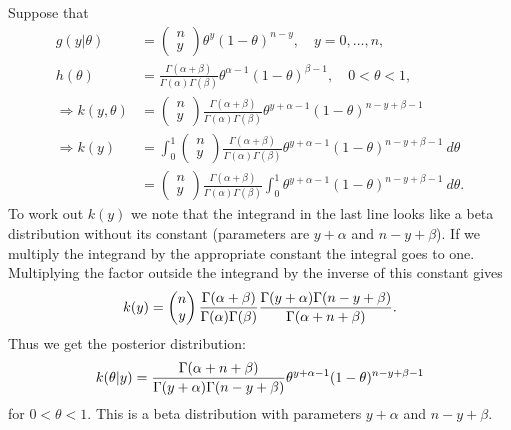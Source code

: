 \documentclass[10pt, two column]{article}
\begin{document}
Suppose that \vspace{-10pt}
\begin{align*} 
g(y \vert \theta) &= \begin{pmatrix} n \\ y \end{pmatrix} \theta^{y} (1 - \theta)^{n-y}, \quad y = 0, \dots, n, \\
h(\theta) &= \frac{\Gamma(\alpha + \beta)}{\Gamma(\alpha) \Gamma(\beta)} \theta^{\alpha -1} (1-\theta)^{\beta - 1}, \quad 0 < \theta < 1, \\
\Rightarrow k(y, \theta) &= \begin{pmatrix} n \\ y \end{pmatrix} \frac{\Gamma(\alpha + \beta)}{\Gamma(\alpha) \Gamma(\beta)} \theta^{y + \alpha -1} (1 - \theta)^{n-y + \beta - 1} \\
\Rightarrow k(y) &= \int_{0}^{1} \begin{pmatrix} n \\ y \end{pmatrix} \frac{\Gamma(\alpha + \beta)}{\Gamma(\alpha) \Gamma(\beta)} \theta^{y + \alpha -1} (1 - \theta)^{n-y + \beta - 1} \: d\theta \\
&= \begin{pmatrix} n \\ y \end{pmatrix} \frac{\Gamma(\alpha + \beta)}{\Gamma(\alpha) \Gamma(\beta)} \int_{0}^{1} \theta^{y + \alpha -1} (1 - \theta)^{n-y + \beta - 1} \: d\theta. 
\end{align*}
To work out $k(y)$ we note that the integrand in the last line looks like a beta distribution without its constant (parameters are $y + \alpha$ and $n - y + \beta$). If we multiply the integrand by the appropriate constant the integral goes to one. Multiplying the factor outside the integrand by the inverse of this constant gives \vspace{-5pt}
\[ 
k(y) = \begin{pmatrix} n \\ y \end{pmatrix} \frac{\Gamma(\alpha + \beta)}{\Gamma(\alpha) \Gamma(\beta)} \frac{\Gamma(y + \alpha)\Gamma(n - y + \beta)}{\Gamma(\alpha + n + \beta)}. \vspace{-5pt}
\]
Thus we get the posterior distribution: \vspace{-5pt}
\[ 
k(\theta \vert y) = \frac{\Gamma(\alpha + n + \beta)}{\Gamma(y + \alpha)\Gamma(n - y + \beta)} \theta^{y + \alpha -1} (1 - \theta)^{n-y + \beta - 1} \vspace{-5pt}
\]
for $0 < \theta < 1$. This is a beta distribution with parameters $y + \alpha$ and $n - y + \beta$. 
\end{document}
